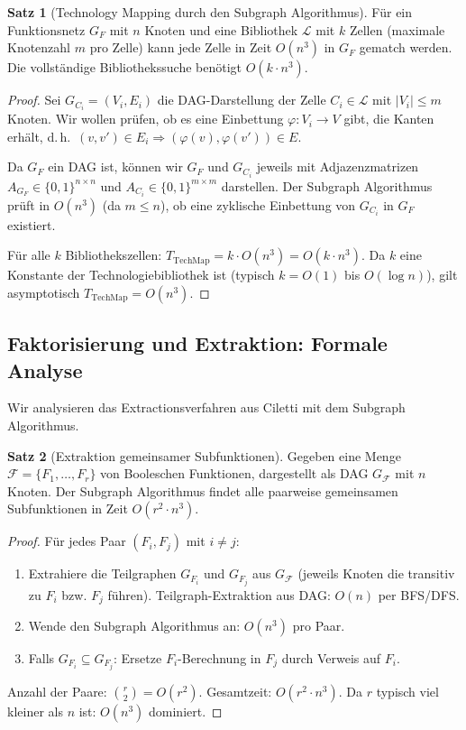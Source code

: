 ﻿\documentclass[a4paper,12pt]{article}
\theoremstyle{definition}
\newtheorem{satz}{Satz}
\begin{document}
\begin{satz}[Technology Mapping durch den Subgraph Algorithmus]\label{satz:techmap}
  Für ein Funktionsnetz $G_F$ mit $n$ Knoten und eine Bibliothek $\mathcal{L}$ mit $k$
  Zellen (maximale Knotenzahl $m$ pro Zelle) kann jede Zelle in Zeit $O(n^3)$ in $G_F$
  gematch werden. Die vollständige Bibliothekssuche benötigt $O(k \cdot n^3)$.
\end{satz}

\begin{proof}
  Sei $G_{C_i} = (V_i, E_i)$ die DAG-Darstellung der Zelle $C_i \in \mathcal{L}$ mit
  $|V_i| \leq m$ Knoten. Wir wollen prüfen, ob es eine Einbettung $\varphi: V_i \to V$
  gibt, die Kanten erhält, d.\,h.\ $(v, v') \in E_i \Rightarrow (\varphi(v), \varphi(v')) \in E$.

  Da $G_F$ ein DAG ist, können wir $G_F$ und $G_{C_i}$ jeweils mit Adjazenzmatrizen
  $A_{G_F} \in \{0,1\}^{n \times n}$ und $A_{C_i} \in \{0,1\}^{m \times m}$ darstellen.
  Der Subgraph Algorithmus prüft in $O(n^3)$ (da $m \leq n$), ob eine
  zyklische Einbettung von $G_{C_i}$ in $G_F$ existiert.

  Für alle $k$ Bibliothekszellen: $T_{\text{TechMap}} = k \cdot O(n^3) = O(k \cdot n^3)$.
  Da $k$ eine Konstante der Technologiebibliothek ist (typisch $k = O(1)$ bis $O(\log n)$),
  gilt asymptotisch $T_{\text{TechMap}} = O(n^3)$.
\end{proof}

\subsection{Faktorisierung und Extraktion: Formale Analyse}

Wir analysieren das Extractionsverfahren aus Ciletti \cite[S.~239, Beispiel 6.2]{ciletti2011}
mit dem Subgraph Algorithmus.

\begin{satz}[Extraktion gemeinsamer Subfunktionen]\label{satz:extraktion}
  Gegeben eine Menge $\mathcal{F} = \{F_1, \ldots, F_r\}$ von Booleschen Funktionen,
  dargestellt als DAG $G_{\mathcal{F}}$ mit $n$ Knoten. Der Subgraph Algorithmus findet
  alle paarweise gemeinsamen Subfunktionen in Zeit $O(r^2 \cdot n^3)$.
\end{satz}

\begin{proof}
  Für jedes Paar $(F_i, F_j)$ mit $i \neq j$:
  \begin{enumerate}
    \item Extrahiere die Teilgraphen $G_{F_i}$ und $G_{F_j}$ aus $G_{\mathcal{F}}$
          (jeweils Knoten die transitiv zu $F_i$ bzw. $F_j$ führen).
          Teilgraph-Extraktion aus DAG: $O(n)$ per BFS/DFS.
    \item Wende den Subgraph Algorithmus an: $O(n^3)$ pro Paar.
    \item Falls $G_{F_i} \subseteq G_{F_j}$: Ersetze $F_i$-Berechnung in $F_j$ durch
          Verweis auf $F_i$.
  \end{enumerate}
  Anzahl der Paare: $\binom{r}{2} = O(r^2)$. Gesamtzeit: $O(r^2 \cdot n^3)$.
  Da $r$ typisch viel kleiner als $n$ ist: $O(n^3)$ dominiert.
\end{proof}
\end{document}
